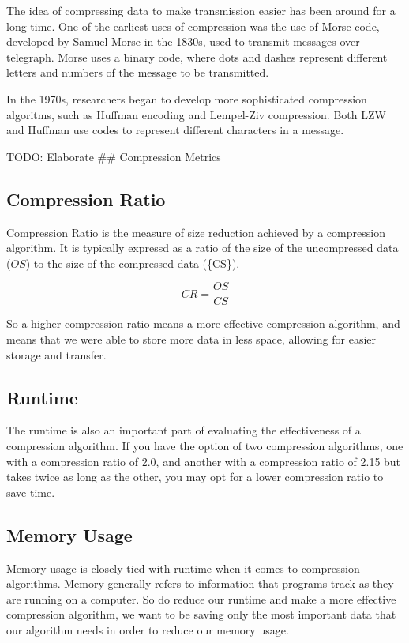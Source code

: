 \documentclass[12pt,twoside]{reedthesis}
\begin{document}
The idea of compressing data to make transmission easier has been around for a long time. One of the earliest uses of compression was the use of Morse code, developed by Samuel Morse in the 1830s, used to transmit messages over telegraph. Morse uses a binary code, where dots and dashes represent different letters and numbers of the message to be transmitted.

In the 1970s, researchers began to develop more sophisticated compression algoritms, such as Huffman encoding and Lempel-Ziv compression. Both LZW and Huffman use codes to represent different characters in a message.

TODO: Elaborate
\#\# Compression Metrics

\hypertarget{compression-ratio}{%
\subsection{Compression Ratio}\label{compression-ratio}}

Compression Ratio is the measure of size reduction achieved by a compression algorithm. It is typically expressd as a ratio of the size of the uncompressed data (\(OS\)) to the size of the compressed data (\{CS\}).

\[CR = \frac{OS}{CS}\]

So a higher compression ratio means a more effective compression algorithm, and means that we were able to store more data in less space, allowing for easier storage and transfer.

\hypertarget{runtime}{%
\subsection{Runtime}\label{runtime}}

The runtime is also an important part of evaluating the effectiveness of a compression algorithm. If you have the option of two compression algorithms, one with a compression ratio of 2.0, and another with a compression ratio of 2.15 but takes twice as long as the other, you may opt for a lower compression ratio to save time.

\hypertarget{memory-usage}{%
\subsection{Memory Usage}\label{memory-usage}}

Memory usage is closely tied with runtime when it comes to compression algorithms. Memory generally refers to information that programs track as they are running on a computer. So do reduce our runtime and make a more effective compression algorithm, we want to be saving only the most important data that our algorithm needs in order to reduce our memory usage.
\end{document}
